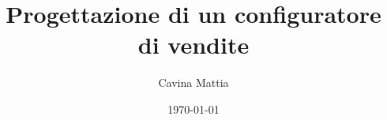 \documentclass[12pt,a4paper,openright,twoside]{book}
\title{Progettazione di un configuratore di vendite}
\author{Cavina Mattia}
\date{\today}
\begin{document}
\frontmatter\frontispiece{}




\tableofcontents
\listoffigures     %
\lstlistoflistings{}  %
\listoftables{}      %

\mainmatter{}




























\appendix





\end{document}
